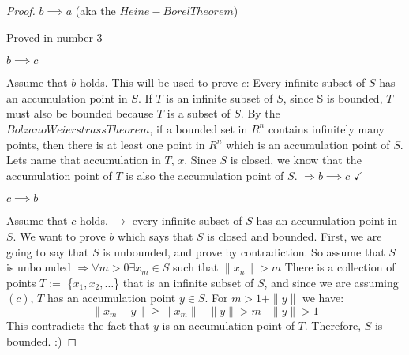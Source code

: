 \documentclass[aps,pra,notitlepage,amsmath,amssymb,letterpaper,12pt]{revtex4-1}
\begin{document}
\begin{proof}
    \(b\implies a\) (aka the \(Heine-Borel Theorem\))
    
    Proved in number 3

    \(b\implies c\)

    Assume that \(b\) holds. This will be used to prove \(c\): Every
infinite subset of \(S\) has an accumulation point in \(S\). If \(T\) is
an infinite subset of \(S\), since S is bounded, \(T\) must also be
bounded because \(T\) is a subset of \(S\). By the
\(Bolzano Weierstrass Theorem\), if a bounded set in \(R^n\) contains
infinitely many points, then there is at least one point in \(R^n\)
which is an accumulation point of \(S\). Lets name that accumulation in
\(T\), \(x\). Since \(S\) is closed, we know that the accumulation point
of \(T\) is also the accumulation point of \(S\).
\(\Rightarrow b\implies c\) \(\checkmark\)

    \(c\implies b\)

    Assume that \(c\) holds. \(\rightarrow\) every infinite subset of \(S\)
has an accumulation point in \(S\). We want to prove \(b\) which says
that \(S\) is closed and bounded. First, we are going to say that \(S\)
is unbounded, and prove by contradiction. So assume that \(S\) is
unbounded \(\Rightarrow \forall m>0\exists x_m\in S\) such that
\(\| x_n\| >m\) There is a collection of points \(T:=\)
\{\(x_1,x_2,\ldots\)\} that is an infinite subset of \(S\), and since we
are assuming \((c)\), \(T\) has an accumulation point \(y\in S\). For
\(m>1+\| y\|\) we have: \[\| x_m-y\| \geq\| x_m\| -\|y \| >m-\|y \| >1\]
This contradicts the fact that \(y\) is an accumulation point of \(T\).
Therefore, \(S\) is bounded. :)


\end{proof}
\end{document}
